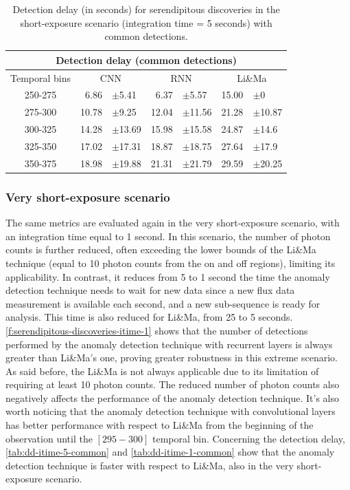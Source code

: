  
\begin{table}[!ht]
\centering
\begin{tabular}{|c|rl|rl|rl|} 
\hline
\multicolumn{7}{|c|}{\textbf{Detection delay} (common detections)} \\ 
\hline
\multicolumn{1}{|c|}{Temporal bins} & \multicolumn{2}{c|}{CNN} & \multicolumn{2}{c|}{RNN} & \multicolumn{2}{c|}{Li\&Ma} \\ 
\hline
250-275 &  6.86 &  $\pm$5.41 &  6.37 &  $\pm$5.57 & 15.00 &  $\pm$0 \\
275-300 & 10.78 &  $\pm$9.25 & 12.04 & $\pm$11.56 & 21.28 & $\pm$10.87 \\
300-325 & 14.28 & $\pm$13.69 & 15.98 & $\pm$15.58 & 24.87 & $\pm$14.6 \\
325-350 & 17.02 & $\pm$17.31 & 18.87 & $\pm$18.75 & 27.64 & $\pm$17.9 \\
350-375 & 18.98 & $\pm$19.88 & 21.31 & $\pm$21.79 & 29.59 & $\pm$20.25 \\
\hline
\end{tabular}
\caption{Detection delay (in seconds) for serendipitous discoveries in the short-exposure scenario (integration time = 5 seconds) with common detections.}
\label{tab:dd-itime-5-common}
\end{table}






\FloatBarrier
\subsubsection{Very short-exposure scenario}
\label{s:Serendipitous-Discoveries-Results-Very-Short-Term}
The same metrics are evaluated again in the very short-exposure scenario, with an integration time equal to 1 second. In this scenario, the number of photon counts is further reduced, often exceeding the lower bounds of the Li\&Ma technique (equal to 10 photon counts from the on and off regions), limiting its applicability. In contrast, it reduces from 5 to 1 second the time the anomaly detection technique needs to wait for new data since a new flux data measurement is available each second, and a new sub-sequence is ready for analysis. This time is also reduced for Li\&Ma, from 25 to 5 seconds. 
\autoref{f:serendipitous-discoveries-itime-1} shows that the number of detections performed by the anomaly detection technique with recurrent layers is always greater than Li\&Ma's one, proving greater robustness in this extreme scenario. As said before, the Li\&Ma is not always applicable due to its limitation of requiring at least 10 photon counts. The reduced number of photon counts also negatively affects the performance of the anomaly detection technique. It's also worth noticing that the anomaly detection technique with convolutional layers has better performance with respect to Li\&Ma from the beginning of the observation until the $[295-300]$ temporal bin. Concerning the detection delay, \autoref{tab:dd-itime-5-common} and \autoref{tab:dd-itime-1-common} show that the anomaly detection technique is faster with respect to Li\&Ma, also in the very short-exposure scenario.

